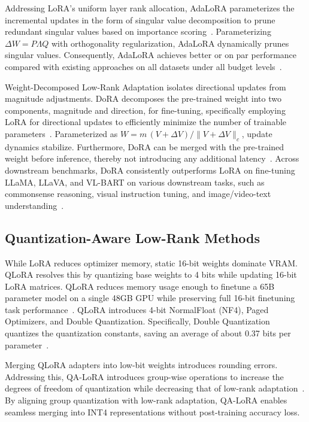 \documentclass[11pt,a4paper]{article}
\begin{document}
Addressing LoRA's uniform layer rank allocation, AdaLoRA parameterizes the incremental updates in the form of singular value decomposition to prune redundant singular values based on importance scoring~\cite{zhang2023adalora}. Parameterizing $\Delta W = P \Lambda Q$ with orthogonality regularization, AdaLoRA dynamically prunes singular values. Consequently, AdaLoRA achieves better or on par performance compared with existing approaches on all datasets under all budget levels~\cite{zhang2023adalora}.

Weight-Decomposed Low-Rank Adaptation isolates directional updates from magnitude adjustments. DoRA decomposes the pre-trained weight into two components, magnitude and direction, for fine-tuning, specifically employing LoRA for directional updates to efficiently minimize the number of trainable parameters~\cite{liu2024dora}. Parameterized as $W = m \, (V + \Delta V) / \|V + \Delta V\|_c$, update dynamics stabilize. Furthermore, DoRA can be merged with the pre-trained weight before inference, thereby not introducing any additional latency~\cite{liu2024dora}. Across downstream benchmarks, DoRA consistently outperforms LoRA on fine-tuning LLaMA, LLaVA, and VL-BART on various downstream tasks, such as commonsense reasoning, visual instruction tuning, and image/video-text understanding~\cite{liu2024dora}.

\subsection{Quantization-Aware Low-Rank Methods}
While LoRA reduces optimizer memory, static 16-bit weights dominate VRAM. QLoRA resolves this by quantizing base weights to 4 bits while updating 16-bit LoRA matrices. QLoRA reduces memory usage enough to finetune a 65B parameter model on a single 48GB GPU while preserving full 16-bit finetuning task performance~\cite{dettmers2023qlora}. QLoRA introduces 4-bit NormalFloat (NF4), Paged Optimizers, and Double Quantization. Specifically, Double Quantization quantizes the quantization constants, saving an average of about 0.37 bits per parameter~\cite{dettmers2023qlora}.

Merging QLoRA adapters into low-bit weights introduces rounding errors. Addressing this, QA-LoRA introduces group-wise operations to increase the degrees of freedom of quantization while decreasing that of low-rank adaptation~\cite{xu2023qa}. By aligning group quantization with low-rank adaptation, QA-LoRA enables seamless merging into INT4 representations without post-training accuracy loss.
\end{document}
